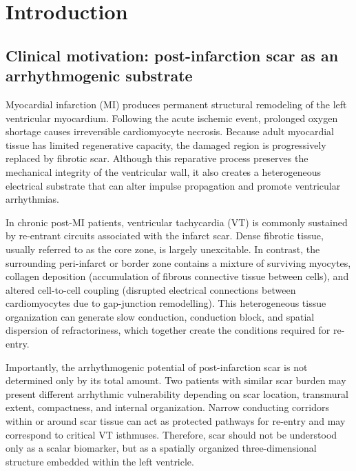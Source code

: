 \chapter*{Introduction}

\section*{Clinical motivation: post-infarction scar as an arrhythmogenic substrate}

Myocardial infarction (MI) produces permanent structural remodeling of the left ventricular
myocardium. Following the acute ischemic event, prolonged oxygen shortage causes
irreversible cardiomyocyte necrosis. Because adult myocardial tissue has limited
regenerative capacity, the damaged region is progressively replaced by fibrotic scar.
Although this reparative process preserves the mechanical integrity of the ventricular wall, it
also creates a heterogeneous electrical substrate that can alter impulse propagation and
promote ventricular arrhythmias.

In chronic post-MI patients, ventricular tachycardia (VT) is commonly sustained by re-entrant
circuits associated with the infarct scar. Dense fibrotic tissue, usually referred to as the core
zone, is largely unexcitable. In contrast, the surrounding peri-infarct or border zone contains
a mixture of surviving myocytes, collagen deposition (accumulation of fibrous connective
tissue between cells), and altered cell-to-cell coupling (disrupted electrical connections
between cardiomyocytes due to gap-junction remodelling). This
heterogeneous tissue organization can generate slow conduction, conduction block, and
spatial dispersion of refractoriness, which together create the conditions required for
re-entry.

Importantly, the arrhythmogenic potential of post-infarction scar is not determined only by its
total amount. Two patients with similar scar burden may present different arrhythmic
vulnerability depending on scar location, transmural extent, compactness, and internal
organization. Narrow conducting corridors within or around scar tissue can act as protected
pathways for re-entry and may correspond to critical VT isthmuses. Therefore, scar should
not be understood only as a scalar biomarker, but as a spatially organized three-dimensional
structure embedded within the left ventricle.

